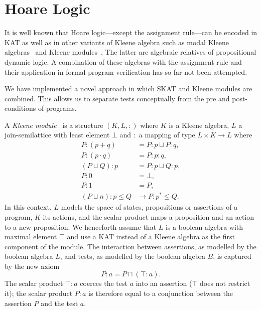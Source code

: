 \documentclass{llncs}
\begin{document}

\section{Hoare Logic}
\label{sec:hoare}

It is well known that Hoare logic---except the assignment rule---can
be encoded in KAT as well as in other variants of Kleene algebra such
as modal Kleene algebras~\cite{MoellerStruth} and Kleene modules~\cite{EhmMoellerStruth}. The
latter are algebraic relatives of propositional dynamic logic. A
combination of these algebras with the assignment rule and their
application in formal program verification has so far not been
attempted.

We have implemented a novel approach in which SKAT and Kleene modules
are combined. This allows us to separate tests conceptually from the
pre and post-conditions of programs.

A \emph{Kleene module}~\cite{Leiss} is a structure $(K,L,:)$ where $K$
is a Kleene algebra, $L$ a join-semilattice with least element $\bot$
and $:$ a mapping of type $L \times K \to L$ where
\begin{align*}
  P : (p + q) &= P : p \sqcup P : q,\\
  P : (p\cdot q) &= P : p : q,\\
  (P \sqcup Q) : p &= P : p \sqcup Q : p,\\
  P : 0 &= \bot,\\
  P : 1 &= P,\\
  (P \sqcup n) : p \le Q &\longrightarrow P : p^\ast \le Q.
\end{align*}
In this context, $L$ models the space of states, propositions or
assertions of a program, $K$ its actions, and the scalar product maps
a proposition and an action to a new proposition. We henceforth assume
that $L$ is a boolean algebra with maximal element $\top$ and use a
KAT instead of a Kleene algebra as the first component of the
module. The interaction between assertions, as modelled by the boolean
algebra $L$, and tests, as modelled by the boolean algebra $B$, is
captured by the new axiom
\begin{equation*}
  P : a = P \sqcap (\top : a).
\end{equation*}
The scalar product $\top : a$ coerces the test $a$ into an assertion
($\top$ does not restrict it); the scalar product $P:a$ is therefore
equal to a conjunction between the assertion $P$ and the test $a$.
\end{document}

